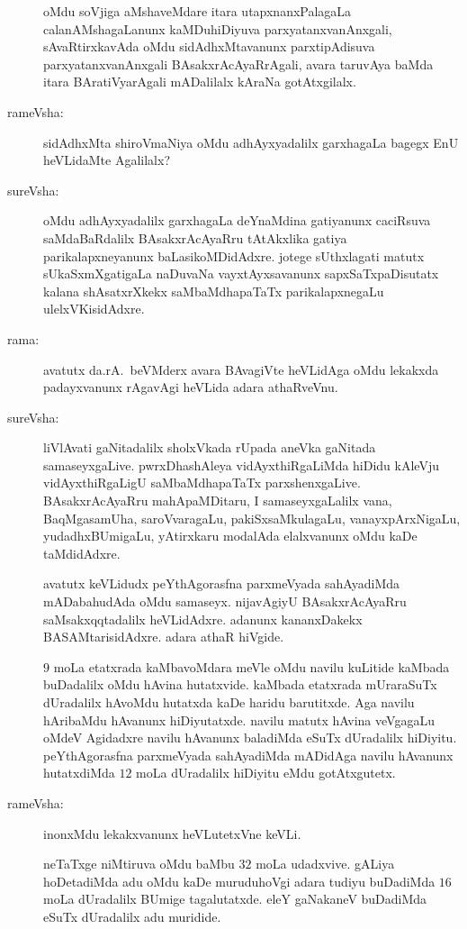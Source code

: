 \begin{description}
oMdu soVjiga aMshaveMdare itara utapxnanxPalagaLa calanAMshagaLanunx kaMDuhiDiyuva parxyatanxvanAnxgali, sAvaRtirxkavAda oMdu sidAdhxMtavanunx parxtipAdisuva parxyatanxvanAnxgali BAsakxrAcAyaRrAgali, avara taruvAya baMda itara BAratiVyarAgali mADalilalx kAraNa gotAtxgilalx.

\item[rameVsha:] sidAdhxMta shiroVmaNiya oMdu adhAyxyadalilx garxhagaLa bagegx EnU heVLidaMte Agalilalx?

\item[sureVsha:] oMdu adhAyxyadalilx garxhagaLa deYnaMdina gatiyanunx caciRsuva saMdaBaRdalilx BAsakxrAcAyaRru tAtAkxlika gatiya parikalapxneyanunx baLasikoMDidAdxre. jotege sUthxlagati matutx sUkaSxmXgatigaLa naDuvaNa vayxtAyxsavanunx sapxSaTxpaDisutatx kalana shAsatxrXkekx saMbaMdhapaTaTx parikalapxnegaLu ulelxVKisidAdxre.

\item[rama:] avatutx da.rA.\ beVMderx avara BAvagiVte heVLidAga oMdu lekakxda padayxvanunx rAgavAgi heVLida adara athaRveVnu.

\item[sureVsha:] liVlAvati gaNitadalilx sholxVkada rUpada aneVka gaNitada samaseyxgaLive. pwrxDhashAleya vidAyxthiRgaLiMda hiDidu kAleVju vidAyxthiRgaLigU saMbaMdhapaTaTx parxshenxgaLive. BAsakxrAcAyaRru mahApaMDitaru, I samaseyxgaLalilx vana, BaqMgasamUha, saroVvaragaLu, pakiSxsaMkulagaLu, vanayxpArxNigaLu, yudadhxBUmigaLu, yAtirxkaru modalAda elalxvanunx oMdu kaDe taMdidAdxre.

avatutx keVLidudx peYthAgorasfna parxmeVyada sahAyadiMda mADabahudAda oMdu samaseyx. nijavAgiyU BAsakxrAcAyaRru saMsakxqqtadalilx heVLidAdxre. adanunx kananxDakekx BASAMtarisidAdxre. adara athaR hiVgide.

$9$ moLa etatxrada kaMbavoMdara meVle oMdu navilu kuLitide kaMbada buDadalilx oMdu hAvina hutatxvide. kaMbada etatxrada mUraraSuTx dUradalilx hAvoMdu hutatxda kaDe haridu barutitxde. Aga navilu hAribaMdu hAvanunx hiDiyutatxde. navilu matutx hAvina veVgagaLu oMdeV Agidadxre navilu hAvanunx baladiMda eSuTx dUradalilx hiDiyitu. peYthAgorasfna parxmeVyada sahAyadiMda mADidAga navilu hAvanunx hutatxdiMda $12$ moLa dUradalilx hiDiyitu eMdu gotAtxgutetx.

\item[rameVsha:] inonxMdu lekakxvanunx heVLutetxVne keVLi.

neTaTxge niMtiruva oMdu baMbu $32$ moLa udadxvive. gALiya hoDetadiMda adu oMdu kaDe muruduhoVgi adara tudiyu buDadiMda $16$ moLa dUradalilx BUmige tagalutatxde. eleY gaNakaneV buDadiMda eSuTx dUradalilx adu muridide.


\end{description}
